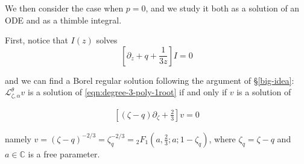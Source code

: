 \documentclass{article}
\theoremstyle{definition}
\newcommand{\C}{\mathbb{C}}
\newcommand{\laplace}{\mathcal{L}}
\begin{document}







We then consider the case when $p=0$, and we study it both as a solution of an ODE and as a thimble integral.

First, notice that $I(z)$ solves
       \begin{equation}\label{eqn:degree-3-poly-1root}
          \left[\partial_z+q+\frac{1}{3z}\right]I=0
       \end{equation}

and we can find a Borel regular solution following the argument of \S \ref{big-idea}: $\laplace_{\zeta,\alpha}^{\theta}v$ is a solution of \eqref{eqn:degree-3-poly-1root} if and only if $v$ is a solution of 

\begin{align*}
   \left[ (\zeta-q)\partial_\zeta +\frac{2}{3}\right] v=0
\end{align*}

namely $v=(\zeta-q)^{-2/3}=\zeta_q^{-2/3}={}_2F_1\left(a,\frac{2}{3};a;1-\zeta_q\right)$, where $\zeta_q=\zeta-q$ and $a\in\C$ is a free parameter. 
\end{document}
